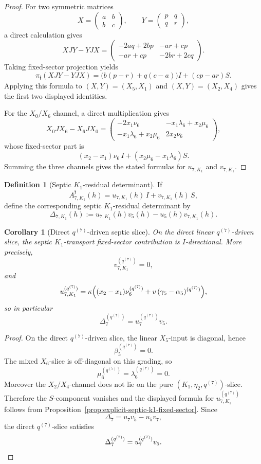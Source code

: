 \documentclass[11pt,a4paper]{amsart}
\theoremstyle{plain}
\newtheorem{corollary}[theorem]{Corollary}
\theoremstyle{definition}
\newtheorem{definition}[theorem]{Definition}
\begin{document}
\begin{proof}
For two symmetric matrices
\[
X=
\begin{pmatrix}
a&b\\
b&c
\end{pmatrix},
\qquad
Y=
\begin{pmatrix}
p&q\\
q&r
\end{pmatrix},
\]
a direct calculation gives
\[
XJY-YJX
=
\begin{pmatrix}
-2aq+2bp & -ar+cp\\
-ar+cp & -2br+2cq
\end{pmatrix}.
\]
Taking fixed-sector projection yields
\[
\pi_{\mathfrak f}(XJY-YJX)
=
\bigl(b(p-r)+q(c-a)\bigr)I
+
(cp-ar)S.
\]
Applying this formula to $(X,Y)=(X_5,X_1)$ and $(X,Y)=(X_2,X_4)$ gives the
first two displayed identities.

For the $X_0/X_6$ channel, a direct multiplication gives
\[
X_0JX_6-X_6JX_0
=
\begin{pmatrix}
-2x_1\nu_6 & -x_1\lambda_6+x_2\mu_6\\
-x_1\lambda_6+x_2\mu_6 & 2x_2\nu_6
\end{pmatrix},
\]
whose fixed-sector part is
\[
(x_2-x_1)\nu_6\,I
+
(x_2\mu_6-x_1\lambda_6)S.
\]
Summing the three channels gives the stated formulas for
$u_{7,K_1}$ and $v_{7,K_1}$.
\end{proof}

\begin{definition}[Septic $K_1$-residual determinant]
\label{def:delta7-k1}
If
\[
A_{7,K_1}^{\mathfrak f}(h)=u_{7,K_1}(h)\,I+v_{7,K_1}(h)\,S,
\]
define the corresponding septic $K_1$-residual determinant by
\[
\Delta_{7,K_1}(h):=u_{7,K_1}(h)v_5(h)-u_5(h)v_{7,K_1}(h).
\]
\end{definition}

\begin{corollary}[Direct $q^{(7)}$-driven septic slice]
\label{cor:direct-q7-septic-slice}
On the direct linear $q^{(7)}$-driven slice, the septic $K_1$-transport
fixed-sector contribution is $I$-directional. More precisely,
\[
v_{7,K_1}^{(q^{(7)})}=0,
\]
and
\[
u_{7,K_1}^{(q^{(7)})}
=
\kappa\Bigl(
(x_2-x_1)\nu_6^{(q^{(7)})}
+
v\,(\gamma_5-\alpha_5)^{(q^{(7)})}
\Bigr),
\]
so in particular
\[
\Delta_7^{(q^{(7)})}=u_7^{(q^{(7)})}v_5.
\]
\end{corollary}

\begin{proof}
On the direct $q^{(7)}$-driven slice, the linear $X_5$-input is diagonal,
hence
\[
\beta_5^{(q^{(7)})}=0.
\]
The mixed $X_6$-slice is off-diagonal on this grading, so
\[
\mu_6^{(q^{(7)})}=\lambda_6^{(q^{(7)})}=0.
\]
Moreover the $X_2/X_4$-channel does not lie on the pure
$(K_1,\eta_2,q^{(7)})$-slice. Therefore the $S$-component vanishes and the
displayed formula for $u_{7,K_1}^{(q^{(7)})}$ follows from
Proposition~\ref{prop:explicit-septic-k1-fixed-sector}. Since
\[
\Delta_7=u_7v_5-u_5v_7,
\]
the direct $q^{(7)}$-slice satisfies
\[
\Delta_7^{(q^{(7)})}=u_7^{(q^{(7)})}v_5.
\qedhere
\]
\end{proof}
\end{document}

